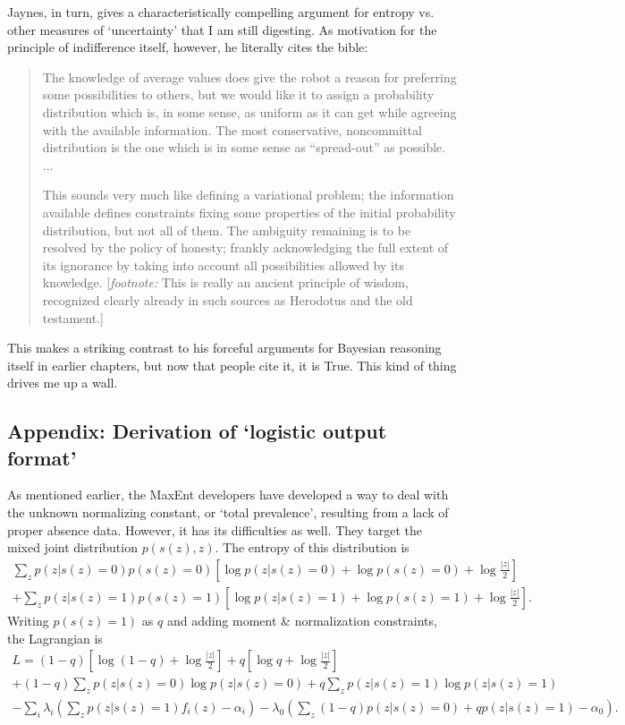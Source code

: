 \begin{itemize}
\begin{quote}
    \end{quote} 
Jaynes, in turn, gives a characteristically compelling argument for entropy vs. other measures of `uncertainty' that I am still digesting. As motivation for the principle of indifference itself, however, he literally cites the bible:
\begin{quote}
    The knowledge of average values does give the robot a reason for preferring some possibilities to others, but we would like it to assign a probability distribution which is, in some sense, as uniform as it can get while agreeing with the available information. The most conservative, noncommittal distribution is the one which is in some sense as ``spread-out'' as possible. ...
    
    This sounds very much like defining a variational problem; the information available defines constraints fixing some properties of the initial probability distribution, but not all of them. The ambiguity remaining is to be resolved by the policy of honesty; frankly acknowledging the full extent of its ignorance by taking into account all possibilities allowed by its knowledge. [\emph{footnote:} This is really an ancient principle of wisdom, recognized clearly already in such sources as Herodotus and the old testament.]
\end{quote}
This makes a striking contrast to his forceful arguments for Bayesian reasoning itself in earlier chapters, but now that people cite it, it is True. This kind of thing drives me up a wall.
\end{itemize}

\subsection{Appendix: Derivation of `logistic output format'}

As mentioned earlier, the MaxEnt developers have developed a way to deal with the unknown normalizing constant, or `total prevalence', resulting from a lack of proper absence data. However, it has its difficulties as well. They target the mixed joint distribution $p(s(z),z)$. The entropy of this distribution is
\begin{eqnarray*}
    \sum_z p(z|s(z)=0)p(s(z)=0)\left[\log p(z|s(z)=0) + \log p(s(z)=0) + \log \frac{|z|}{2}\right]\\
    +\sum_z p(z|s(z)=1)p(s(z)=1)\left[\log p(z|s(z)=1) + \log p(s(z)=1) + \log \frac{|z|}{2}\right].
\end{eqnarray*}
Writing $p(s(z)=1)$ as $q$ and adding moment \& normalization constraints, the Lagrangian is
\begin{eqnarray*}
    L=(1-q)\left[\log(1-q)+ \log \frac{|z|}{2}\right] + q\left[\log q+ \log \frac{|z|}{2}\right]\\
    +(1-q)\sum_z p(z|s(z)=0)\log p(z|s(z)=0) + q\sum_z p(z|s(z)=1)\log p(z|s(z)=1)\\
    -\sum_i \lambda_i \left(\sum_z p(z|s(z)=1) f_i(z)-\alpha_i\right) - \lambda_0 \left(\sum_z (1-q)p(z|s(z)=0) + qp(z|s(z)=1) -\alpha_0\right).
\end{eqnarray*}

